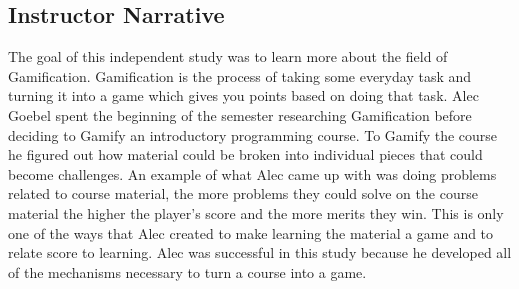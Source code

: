 
\subsection*{Instructor Narrative}
The goal of this independent study was to learn more about the field
of Gamification. Gamification is the process of taking some everyday
task and turning it into a game which gives you points based on doing
that task. Alec Goebel spent the beginning of the semester researching
Gamification before deciding to Gamify an introductory programming
course. To Gamify the course he figured out how material could be broken
into individual pieces that could become challenges. An example of
what Alec came up with was doing problems related to course material,
the more problems they could solve on the course material the higher
the player's score and the more merits they win. This is only one of
the ways that Alec created to make learning the material a game and to
relate score to learning. Alec was successful in this study because he
developed all of the mechanisms necessary to turn a course into a game.

